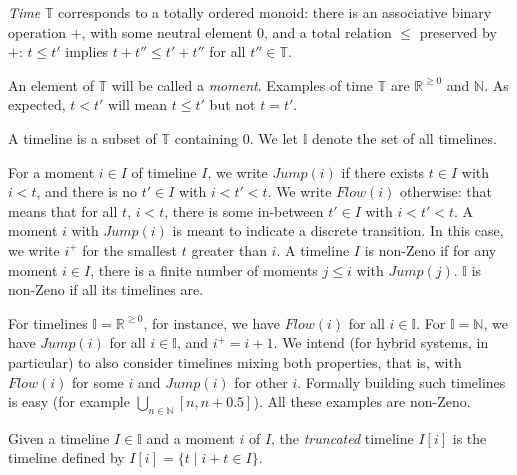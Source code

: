 \documentclass[envcountsame]{llncs}
\newcommand{\Continuous}[1]{\mathit{Flow}(#1)}   \newcommand{\notContinuous}[1]{\mathit{Jump}(#1)}   \newcommand{\Machine}{\textsc{Dynamic}}
\newcommand{\R}{\ensuremath{\mathbb{R}}}
\newcommand{\N}{\ensuremath{\mathbb{N}}}
\newcommand{\I}{\ensuremath{\mathbb{I}}}
\newcommand{\TT}{\ensuremath{\mathbb{T}}}
\newcommand{\nd}[1]{#1}\let\ep\endproof
\renewcommand{\endproof}{\qed\ep}
\begin{document}
\begin{definition}[Time]
  \emph{Time} $\TT$  corresponds
to a totally ordered monoid: there is an associative binary
    operation $+$, with some neutral element $0$, and a total relation $\le$ preserved
  by $+$:  $t \le t'$ implies $t+t'' \le t'+t''$ for all $t''\in\TT$.
\end{definition}


An element of $\TT$ will be called a \emph{moment}. Examples of time \TT\@
are $\R^{\geq 0}$ and $\N$. As expected, $t < t'$ will mean $t
\le t'$ but not $t = t'$.





\begin{definition}[Timeline]
A timeline is a subset of $\TT$ containing $0$. We let $\I$ denote the set of all timelines.
\end{definition}



For a moment $i \in I$ of timeline $I$,  we write $\notContinuous{i}$ if there exists
$t \in I$ with $i<t$, and there is no $t' \in I$ with $i < t' < t$.
We write $\Continuous{i}$ otherwise: that means that for all $t$, $i<t$,
there is some in-between $t' \in I$ with $i < t' < t$.
\nd{A moment $i$ with $\notContinuous{i}$ is meant to indicate a
  discrete transition.  In this case, we write $i^+$ for the smallest
  $t$ greater than $i$.}
A timeline $I$ is non-Zeno if for any moment $i \in I$, there is a
finite number of moments $j \le i$ with $\notContinuous{j}$. $\I$ is
non-Zeno if all its timelines are. 



For timelines $\I=\R^{\geq 0}$, for instance, we have $\Continuous{i}$ for all $i \in
    \I$.
    For $\I=\N$, we have $\notContinuous{i}$ for all $i \in \I$, and
    $i^+=i+1$.
We intend (for hybrid systems, in particular) to also
    consider timelines  mixing both properties, that is, with
    $\Continuous{i}$ for some $i$ and $\notContinuous{i}$ for
    other $i$. Formally building  such timelines is easy (for
      example $\bigcup_{n \in \N} [n,n+0.5]$). All these examples are non-Zeno.



\begin{definition}[Truncation]
Given a timeline $I\in\I$ and a moment $i$ of $I$, the
\emph{truncated} timeline $I[i]$ is the timeline defined by
$I[i] = \{t \mid  i+t \in I\}$.
\end{definition}
\end{document}
